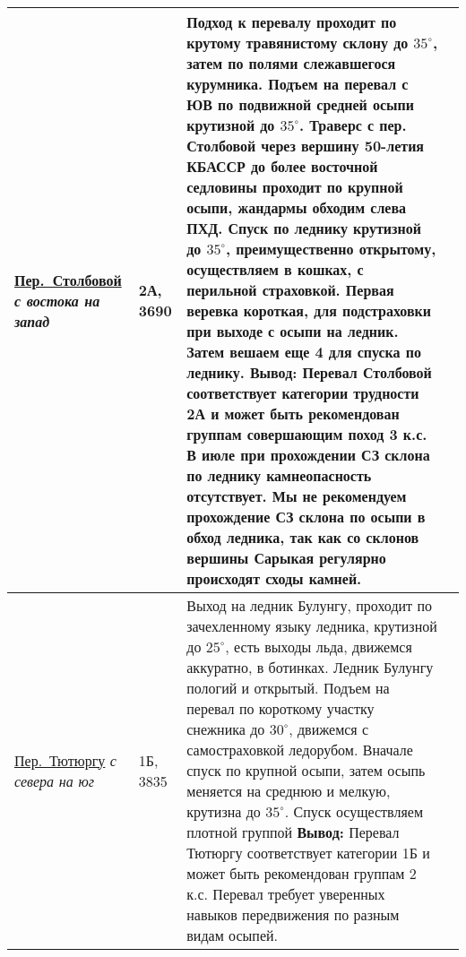 \begin{longtable}{|>{\centering\arraybackslash}m{4.5cm}|>{\centering\arraybackslash}m{1.8cm}|>{\raggedright\arraybackslash}m{9.6cm}|>{\centering\arraybackslash}m{1.2cm}|}
		 	\hyperref[subsec:Day11]{{\small Пер.~Столбовой}}																\newline\textit{с востока на запад}		&	2А, 3690					&	{\small Подход к перевалу проходит по крутому травянистому склону  до $35^\circ$, затем по полями слежавшегося курумника. Подъем на перевал с ЮВ по подвижной средней осыпи крутизной до $35^\circ$. Траверс с пер. Столбовой через вершину 50-летия КБАССР до более восточной седловины проходит по крупной осыпи, жандармы обходим слева ПХД. Спуск по леднику крутизной до $35^\circ$, преимущественно открытому, осуществляем в кошках, с перильной страховкой. Первая веревка короткая, для подстраховки при выходе с осыпи на ледник. Затем вешаем еще 4 для спуска по леднику. \newline \textbf{Вывод:} Перевал Столбовой соответствует категории трудности 2А и может быть рекомендован группам совершающим поход 3 к.с. В июле при прохождении СЗ склона по леднику камнеопасность отсутствует. Мы не рекомендуем прохождение СЗ склона по осыпи в обход ледника, так как со склонов вершины Сарыкая регулярно происходят сходы камней.}																																																																																																																																																																																																			&			\\ \hline
			\hyperref[subsec:Day12]{{\small Пер.~Тютюргу}}																	\newline\textit{с севера на юг}			&	1Б, 3835					&	{\small Выход на ледник Булунгу, проходит по зачехленному языку ледника, крутизной до $25^\circ$, есть выходы льда, движемся аккуратно, в ботинках. Ледник Булунгу пологий и открытый. Подъем на перевал по короткому участку снежника до $30^\circ$, движемся с самостраховкой ледорубом. Вначале спуск по крупной осыпи, затем осыпь меняется на среднюю и мелкую, крутизна до $35^\circ$. Спуск осуществляем плотной группой \newline \textbf{Вывод:} Перевал Тютюргу соответствует категории 1Б и может быть рекомендован группам 2 к.с. Перевал требует уверенных навыков передвижения по разным видам осыпей.}																																																																																																																																																																																																																																								&			\\ \hline

\end{longtable}
